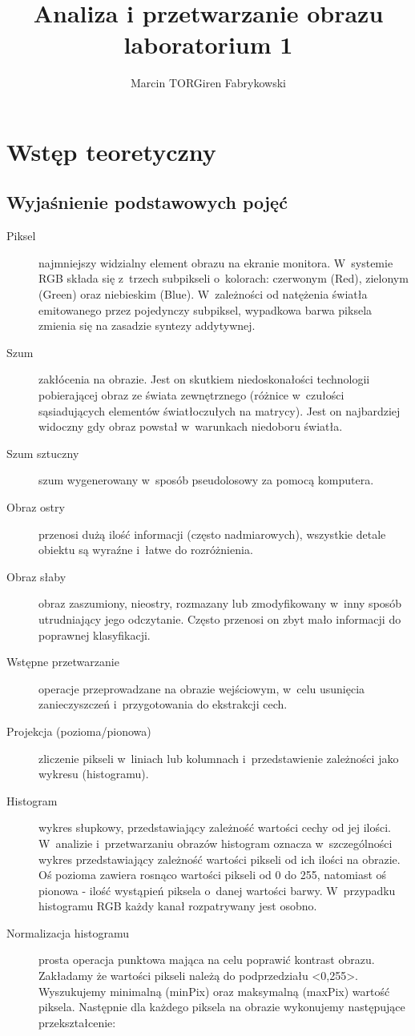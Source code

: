 \documentclass[12pt,a4paper]{article}
\author{Marcin TORGiren Fabrykowski}
\title{Analiza i przetwarzanie obrazu\\laboratorium 1}
\begin{document}
\maketitle
\newpage
\section{Wstęp teoretyczny}
\subsection{Wyjaśnienie podstawowych pojęć}
\begin{description}
\item[Piksel] najmniejszy widzialny element obrazu na ekranie monitora. W~systemie RGB składa się z~trzech subpikseli o~kolorach: czerwonym (Red), zielonym (Green) oraz niebieskim (Blue). W~zależności od natężenia światła emitowanego przez pojedynczy subpiksel, wypadkowa barwa piksela zmienia się na zasadzie syntezy addytywnej. 
\item[Szum] zakłócenia na obrazie. Jest on skutkiem niedoskonałości technologii pobierającej obraz ze świata zewnętrznego (różnice w~czułości sąsiadujących elementów światłoczułych na matrycy). Jest on najbardziej widoczny gdy obraz powstał w~warunkach niedoboru światła. 
\item[Szum sztuczny] szum wygenerowany w~sposób pseudolosowy za pomocą komputera.
\item[Obraz ostry] przenosi dużą ilość informacji (często nadmiarowych), wszystkie detale obiektu są wyraźne i~łatwe do rozróżnienia.
\item[Obraz słaby] obraz zaszumiony, nieostry, rozmazany lub zmodyfikowany w~inny sposób utrudniający jego odczytanie. Często przenosi on zbyt mało informacji do poprawnej klasyfikacji.
\item[Wstępne przetwarzanie] operacje przeprowadzane na obrazie wejściowym, w~celu usunięcia zanieczyszczeń i~przygotowania do ekstrakcji cech.
\item[Projekcja (pozioma/pionowa)] zliczenie pikseli w~liniach lub kolumnach i~przedstawienie zależności jako wykresu (histogramu).
\item[Histogram] wykres słupkowy, przedstawiający zależność wartości cechy od jej ilości. W~analizie i~przetwarzaniu obrazów histogram oznacza w~szczególności wykres przedstawiający zależność wartości pikseli od ich ilości na obrazie. Oś pozioma zawiera rosnąco wartości pikseli od 0 do 255, natomiast oś pionowa - ilość wystąpień piksela o~danej wartości barwy. W~przypadku histogramu RGB każdy kanał rozpatrywany jest osobno.
\item[Normalizacja histogramu] prosta operacja punktowa mająca na celu poprawić kontrast obrazu. Zakładamy że wartości pikseli należą do podprzedziału <0,255>. Wyszukujemy minimalną (minPix) oraz maksymalną (maxPix) wartość piksela. Następnie dla każdego piksela na obrazie wykonujemy następujące przekształcenie:
\end{description}
\end{document}
